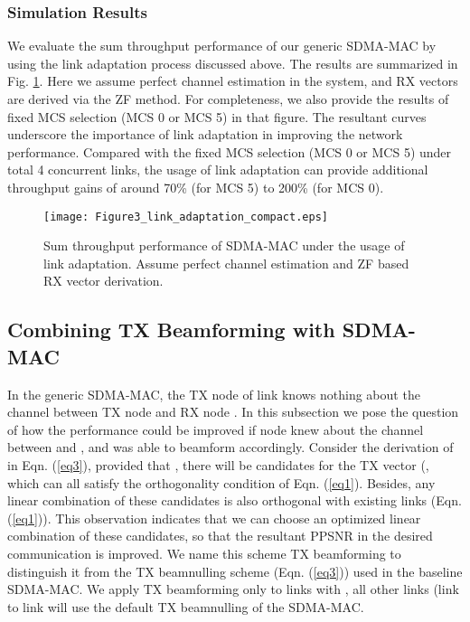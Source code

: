 \documentclass[journal, final]{IEEEtran}
\begin{document}
\subsubsection{Simulation Results}

We evaluate the sum throughput performance of our generic SDMA-MAC by using
the link adaptation process discussed above. The results are summarized in
Fig. \ref{Fig3_link_adaptation}. Here we assume perfect channel estimation in the system, and RX
vectors are derived via the ZF method. For completeness, we also provide the
results of fixed MCS selection (MCS 0 or MCS 5) in that figure. The
resultant curves underscore the importance of link adaptation in improving
the network performance. Compared with the fixed MCS selection (MCS 0 or MCS
5) under total 4 concurrent links, the usage of link adaptation can provide
additional throughput gains of around 70{\%} (for MCS 5) to 200{\%} (for MCS
0).

\begin{figure}
\centering
\texttt{[image: Figure3\_link\_adaptation\_compact.eps]}
\caption{Sum throughput performance of SDMA-MAC under the usage of link adaptation. Assume perfect channel estimation and ZF based RX vector derivation.}
\label{Fig3_link_adaptation}
\end{figure}

\subsection{Combining TX Beamforming with SDMA-MAC}

In the generic SDMA-MAC, the TX node  of link  knows nothing
about the channel between TX node  and RX node . In this
subsection we pose the question of how the performance could be improved if
node  knew about the channel between  and , and was able
to beamform accordingly. Consider the derivation of  in Eqn. (\ref{eq3}),
provided that , there will be  candidates for the
TX vector  (, which can all
satisfy the orthogonality condition of Eqn. (\ref{eq1}). Besides, any linear
combination of these candidates is also orthogonal with existing links (Eqn.
(\ref{eq1})). This observation indicates that we can choose an optimized linear
combination of these candidates, so that the resultant PPSNR in the desired
communication is improved. We name this scheme TX beamforming to distinguish
it from the TX beamnulling scheme (Eqn. (\ref{eq3})) used in the baseline SDMA-MAC. We apply TX
beamforming only to links  with , all other links (link
 to link  will use the default TX beamnulling of the
SDMA-MAC.
\end{document}
